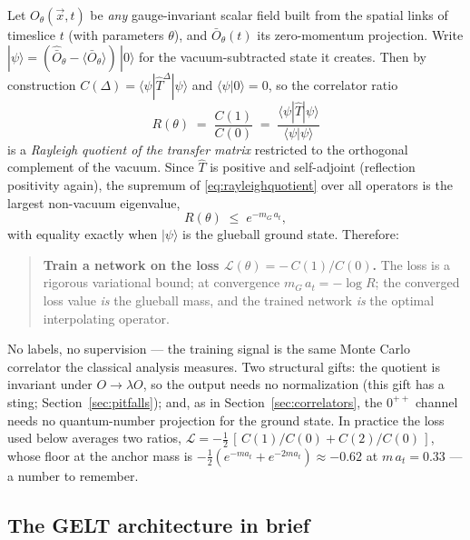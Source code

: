 \documentclass[11pt,a4paper]{article}
\newcommand{\Obar}{\bar{O}}
\newcommand{\at}{a_t}
\newcommand{\That}{\hat{T}}
\begin{document}
Let $O_\theta(\vec x, t)$ be \emph{any} gauge-invariant scalar field built
from the spatial links of timeslice $t$ (with parameters $\theta$), and
$\Obar_\theta(t)$ its zero-momentum projection. Write
$|\psi\rangle = (\hat{\bar O}_\theta - \langle\Obar_\theta\rangle)\,|0\rangle$
for the vacuum-subtracted state it creates. Then by construction
$C(\Delta) = \langle\psi|\That^\Delta|\psi\rangle$ and $\langle\psi|0\rangle=0$,
so the correlator ratio
\begin{equation}
  R(\theta) \;=\; \frac{C(1)}{C(0)}
  \;=\; \frac{\langle\psi|\That|\psi\rangle}{\langle\psi|\psi\rangle}
  \label{eq:rayleighquotient}
\end{equation}
is a \emph{Rayleigh quotient of the transfer matrix} restricted to the
orthogonal complement of the vacuum. Since $\That$ is positive and
self-adjoint (reflection positivity again), the supremum of
\eqref{eq:rayleighquotient} over all operators is the largest non-vacuum
eigenvalue,
\begin{equation}
  R(\theta) \;\le\; e^{-m_G\,\at},
\end{equation}
with equality exactly when $|\psi\rangle$ is the glueball ground state.
Therefore:
\begin{quote}
\textbf{Train a network on the loss $\mathcal{L}(\theta) = -\,C(1)/C(0)$.}
The loss is a rigorous variational bound; at convergence
$m_G\,\at = -\log R$; the converged loss value \emph{is} the glueball mass,
and the trained network \emph{is} the optimal interpolating operator.
\end{quote}
No labels, no supervision --- the training signal is the same Monte Carlo
correlator the classical analysis measures. Two structural gifts: the
quotient is invariant under $O\to\lambda O$, so the output needs no
normalization (this gift has a sting; Section~\ref{sec:pitfalls}); and, as in
Section~\ref{sec:correlators}, the $0^{++}$ channel needs no quantum-number
projection for the ground state. In practice the loss used below averages two
ratios, $\mathcal{L} = -\tfrac12\,[\,C(1)/C(0) + C(2)/C(0)\,]$, whose floor at
the anchor mass is $-\tfrac12(e^{-m\at}+e^{-2m\at}) \approx -0.62$ at
$m\,\at=0.33$ --- a number to remember.

\subsection{The GELT architecture in brief}
\end{document}
